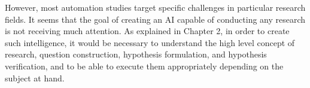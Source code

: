 \documentclass{article}
\begin{document}
However, most automation studies target specific challenges in particular research fields. It seems that the goal of creating an AI capable of conducting any research is not receiving much attention. As explained in Chapter 2, in order to create such intelligence, it would be necessary to understand the high level concept of research, question construction, hypothesis formulation, and hypothesis verification, and to be able to execute them appropriately depending on the subject at hand.




\end{document}
